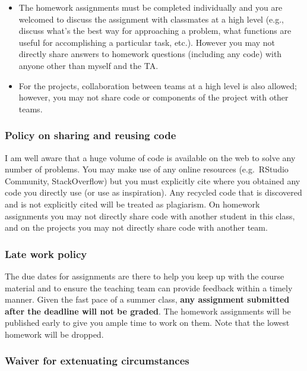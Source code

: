 \documentclass[
  letterpaper,
  DIV=11,
  numbers=noendperiod]{scrartcl}
\providecommand{\tightlist}{%
  \setlength{\itemsep}{0pt}\setlength{\parskip}{0pt}}
\begin{document}
\begin{itemize}
\tightlist
\item
  The homework assignments must be completed individually and you are
  welcomed to discuss the assignment with classmates at a high level
  (e.g., discuss what's the best way for approaching a problem, what
  functions are useful for accomplishing a particular task, etc.).
  However you may not directly share answers to homework questions
  (including any code) with anyone other than myself and the TA.
\item
  For the projects, collaboration between teams at a high level is also
  allowed; however, you may not share code or components of the project
  with other teams.
\end{itemize}

\hypertarget{policy-on-sharing-and-reusing-code}{%
\subsubsection{Policy on sharing and reusing
code}\label{policy-on-sharing-and-reusing-code}}

I am well aware that a huge volume of code is available on the web to
solve any number of problems. You may make use of any online resources
(e.g.~RStudio Community, StackOverflow) but you must explicitly cite
where you obtained any code you directly use (or use as inspiration).
Any recycled code that is discovered and is not explicitly cited will be
treated as plagiarism. On homework assignments you may not directly
share code with another student in this class, and on the projects you
may not directly share code with another team.

\hypertarget{late-work-policy}{%
\subsubsection{Late work policy}\label{late-work-policy}}

The due dates for assignments are there to help you keep up with the
course material and to ensure the teaching team can provide feedback
within a timely manner. Given the fast pace of a summer class,
\textbf{any assignment submitted after the deadline will not be graded}.
The homework assignments will be published early to give you ample time
to work on them. Note that the lowest homework will be dropped.

\hypertarget{waiver-for-extenuating-circumstances}{%
\subsubsection{Waiver for extenuating
circumstances}\label{waiver-for-extenuating-circumstances}}
\end{document}
